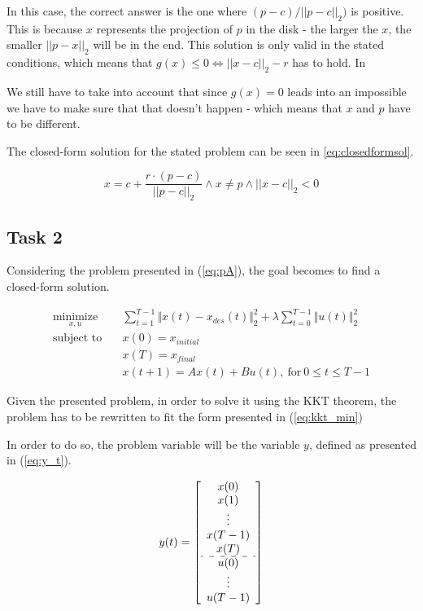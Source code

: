 In this case, the correct answer is the one where $(p - c)/||p-c||_2)$ is positive. This is because $x$ represents the projection of $p$ in the disk - the larger the $x$, the smaller $||p - x||_2$ will be in the end. This solution is only valid in the stated conditions, which means that $g(x) \leq 0 \Leftrightarrow ||x - c||_2 - r$ has to hold. In 

We still have to take into account that since $g(x) = 0$ leads into an impossible we have to make sure that that doesn't happen - which means that $x$ and $p$ have to be different.

The closed-form solution for the stated problem can be seen in \eqref{eq:closedformsol}.

\begin{equation}
\label{eq:closedformsol}
    x = c + \frac{r \cdot (p - c)}{||p - c||_2} \wedge x \neq p \wedge ||x - c||_2 < 0
\end{equation}

\subsection{Task 2}
Considering the problem presented in (\ref{eq:pA}), the goal becomes to find a closed-form solution.

\begin{equation}
\label{eq:pA}
\begin{aligned}
\underset{x,u}{\text{minimize}} \quad & \sum_{t = 1}^{T-1} \Vert  x(t) - x_{des}(t)  \Vert_2^2   + \lambda \sum_{t = 0}^{T-1} \Vert  u(t)  \Vert_2^2 \\ 
\text{subject to} \quad & x(0) = x_{initial} \\
                  & x(T) = x_{final} \\
                  & x(t+1) = Ax(t) + Bu(t), \ \text{for} \  0 \leq t  \leq T - 1 
\end{aligned}
\end{equation}

Given the presented problem, in order to solve it using the KKT theorem, the problem has to be rewritten to fit the form presented in (\ref{eq:kkt_min})

In order to do so, the problem variable will be the variable $y$, defined as presented in (\ref{eq:y_t}).

\begin{equation}
\label{eq:y_t}
    y(t) = 
    \left[
    \begin{array}{c}
    x(0) \\
    x(1) \\
    \vdots \\
    x(T-1) \\
    x(T) \\ \hdashline
    u(0) \\
    \vdots \\
    u(T-1)
    \end{array}
    \right]
\end{equation}


